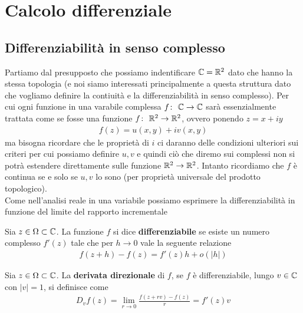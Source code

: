 \chapter{Calcolo differenziale}

\section{Differenziabilità in senso complesso}

Partiamo dal presupposto che possiamo indentificare $\mathbb{C} = \mathbb{R}^2$ dato che hanno la stessa topologia (e noi siamo interessati principalmente a questa struttura dato che vogliamo definire la contiuità e la differenziabilità in senso complesso). Per cui ogni funzione in una varabile complessa $f \colon\ \mathbb{C} \rightarrow \mathbb{C}$ sarà essenzialmente trattata come se fosse una funzione $f \colon\ \mathbb{R}^2 \rightarrow \mathbb{R}^2$, ovvero ponendo $z = x + iy$
\begin{equation}
\begin{aligned}
	f(z) = u(x,y) + iv(x,y)
\end{aligned}
\end{equation}
ma bisogna ricordare che le proprietà di $i$ ci daranno delle condizioni ulteriori sui criteri per cui possiamo definire $u, v$ e quindi ciò che diremo sui complessi non si potrà estendere direttamente sulle funzione $\mathbb{R}^2 \to \mathbb{R}^2$. Intanto ricordiamo che $f$ è continua se e solo se $u,v$ lo sono (per proprietà universale del prodotto topologico).\\

Come nell'analisi reale in una variabile possiamo esprimere la differenziabilità in funzione del limite del rapporto incrementale

\begin{definition}
	Sia $z \in \Omega \subset \mathbb{C}$. La funzione $f$ si dice \textbf{differenziabile} se esiste un numero complesso $f'(z)$ tale che per $h \to 0$ vale la seguente relazione
	\begin{equation}
	\begin{aligned}
		f(z+ h) - f(z) = f'(z)h + o(|h|)
	\end{aligned}
	\end{equation} 
\end{definition}

\begin{definition}
	Sia $z \in \Omega \subset \mathbb{C}$. La \textbf{derivata direzionale} di $f$, se $f$ è differenziabile, lungo $v \in \mathbb{C}$ con $|v| = 1$, si definisce come
	\begin{equation}
	\begin{aligned}
		D_v f(z) = \lim_{r \to 0} \frac{f(z + rv) - f(z)}{r} = f'(z) v
	\end{aligned}
	\end{equation}
\end{definition}



